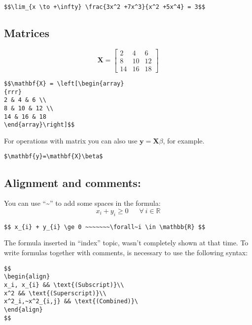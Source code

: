 \documentclass[]{article}
\begin{document}
\begin{verbatim}
$$\lim_{x \to +\infty} \frac{3x^2 +7x^3}{x^2 +5x^4} = 3$$
\end{verbatim}

\subsection{Matrices}\label{matrices}

\[\mathbf{X} = \left[\begin{array}
{rrr}
2 & 4 & 6 \\
8 & 10 & 12 \\
14 & 16 & 18
\end{array}\right]\]

\begin{verbatim}
$$\mathbf{X} = \left[\begin{array}
{rrr}
2 & 4 & 6 \\
8 & 10 & 12 \\
14 & 16 & 18
\end{array}\right]$$
\end{verbatim}

For operations with matrix you can also use
\(\mathbf{y}=\mathbf{X}\beta\), for example.

\begin{verbatim}
$\mathbf{y}=\mathbf{X}\beta$
\end{verbatim}

\subsection{Alignment and comments:}\label{alignment-and-comments}

You can use ``\textasciitilde{}'' to add some spaces in the formula:
\[ x_{i} + y_{i} \ge 0 ~~~~~~~\forall~i \in \mathbb{R} \]

\begin{verbatim}
$$ x_{i} + y_{i} \ge 0 ~~~~~~~\forall~i \in \mathbb{R} $$
\end{verbatim}

The formula inserted in ``index'' topic, wasn't completely shown at that
time. To write formulas together with comments, is necessary to use the
following syntax:

\begin{verbatim}
$$
\begin{align}
x_i, x_{i} && \text{(Subscript)}\\
x^2 && \text{(Superscript)}\\
x^2_i,~x^2_{i,j} && \text{(Combined)}\  
\end{align}
$$
\end{verbatim}
\end{document}

